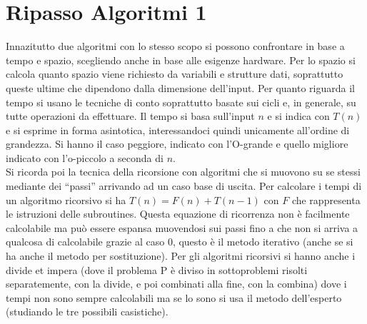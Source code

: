 \documentclass[a4paper,12pt, oneside]{book}
\begin{document}
\section{Ripasso Algoritmi 1}
Innazitutto due algoritmi con lo stesso scopo si possono confrontare
in base a tempo e spazio, scegliendo anche in base alle esigenze
hardware. Per lo spazio si calcola quanto spazio viene richiesto da
variabili e strutture dati, soprattutto queste ultime che dipendono
dalla dimensione dell'input. Per quanto riguarda il tempo si usano le
tecniche di conto soprattutto basate sui cicli e, in generale, su
tutte operazioni da effettuare. Il tempo si basa sull'input $n$ e si
indica con $T(n)$ e si esprime in forma asintotica, interessandoci
quindi unicamente all'ordine di grandezza. Si hanno il caso peggiore,
indicato con l'O-grande e quello migliore indicato con l'o-piccolo
a seconda di $n$.\\
Si ricorda poi la tecnica della ricorsione con algoritmi che si
muovono su se stessi mediante dei ``passi'' arrivando ad un caso base
di uscita. Per calcolare i tempi di un algoritmo ricorsivo si ha
$T(n)=F(n)+T(n-1)$ con $F$ che rappresenta le istruzioni delle
subroutines. Questa equazione di ricorrenza non è facilmente
calcolabile ma può essere espansa muovendosi sui passi fino a che non
si arriva a qualcosa di calcolabile grazie al caso 0, questo è il
metodo iterativo (anche se si ha anche il metodo per
sostituzione). Per gli algoritmi ricorsivi si hanno anche i divide et
impera (dove il problema P è diviso in sottoproblemi risolti
separatemente, con la divide, e poi combinati alla fine, con la
combina) dove i tempi non sono sempre calcolabili ma se lo sono
si usa il metodo dell'esperto (studiando le tre possibili casistiche).
\end{document}
